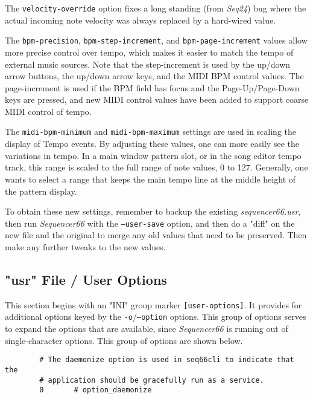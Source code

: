       The \texttt{velocity-override} option fixes a long standing (from
      \textsl{Seq24}) bug where the actual incoming note velocity was always
      replaced by a hard-wired value.

      The \texttt{bpm-precision}, \texttt{bpm-step-increment}, and
      \texttt{bpm-page-increment} values allow more precise control over tempo,
      which makes it easier to match the tempo of external music sources.  Note
      that the step-increment is used by the up/down arrow buttons, the up/down
      arrow keys, and the MIDI BPM control values.  The page-increment is used
      if the BPM field has focus and the Page-Up/Page-Down keys are pressed,
      and new MIDI control values have been added to support coarse MIDI
      control of tempo.

		The \texttt{midi-bpm-minimum} and \texttt{midi-bpm-maximum} settings
		are used in scaling the display of Tempo events.
      By adjusting these values, one can more easily see the variations in
      tempo.  In a main window pattern slot, or in the song editor tempo track,
      this range is scaled to the full range of note values, 0 to 127.
      Generally, one wants to select a range that keeps the main tempo line at
      the middle height of the pattern display.

   To obtain these new settings, remember to backup the existing
   \textsl{sequencer66.usr}, then run \textsl{Sequencer66} with the
   \texttt{--user-save} option, and then do a "diff" on the new file and the
   original to merge any old values that need to be preserved.  Then make any
   further tweaks to the new values.

\subsection{"usr" File / User Options}
\label{subsec:seq66_usr_file_user_options}

   This section begins with an
   "INI" group marker \texttt{[user-options]}.
   It provides for additional options keyed by the
   \texttt{-o}/\texttt{--option} options.
   This group of options serves to expand the options that are available, since
   \textsl{Sequencer66} is  running out of single-character options.
   This group of options are shown below.

   \begin{verbatim}
		# The daemonize option is used in seq66cli to indicate that the
		# application should be gracefully run as a service.
		0       # option_daemonize
   \end{verbatim}

